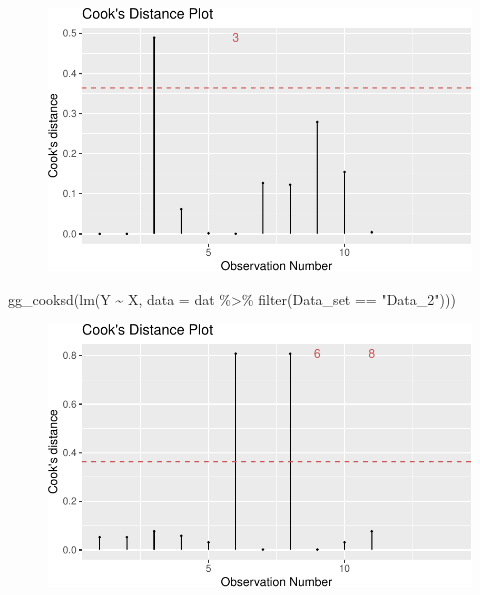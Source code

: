 \documentclass[
  letterpaper,
  DIV=11,
  numbers=noendperiod]{scrreprt}
\newenvironment{Shaded}{\begin{snugshade}}{\end{snugshade}}
\newcommand{\AttributeTok}[1]{\textcolor[rgb]{0.40,0.45,0.13}{#1}}
\newcommand{\FunctionTok}[1]{\textcolor[rgb]{0.28,0.35,0.67}{#1}}
\newcommand{\NormalTok}[1]{\textcolor[rgb]{0.00,0.23,0.31}{#1}}
\newcommand{\SpecialCharTok}[1]{\textcolor[rgb]{0.37,0.37,0.37}{#1}}
\newcommand{\StringTok}[1]{\textcolor[rgb]{0.13,0.47,0.30}{#1}}
\begin{document}
\begin{figure}[H]

{\centering \includegraphics{./08-linearreg_files/figure-pdf/unnamed-chunk-28-1.pdf}

}

\end{figure}

\begin{Shaded}
\begin{Highlighting}[]
\FunctionTok{gg\_cooksd}\NormalTok{(}\FunctionTok{lm}\NormalTok{(Y }\SpecialCharTok{\textasciitilde{}}\NormalTok{ X, }\AttributeTok{data =}\NormalTok{ dat }\SpecialCharTok{\%\textgreater{}\%} \FunctionTok{filter}\NormalTok{(Data\_set }\SpecialCharTok{==} \StringTok{"Data\_2"}\NormalTok{)))}
\end{Highlighting}
\end{Shaded}

\begin{figure}[H]

{\centering \includegraphics{./08-linearreg_files/figure-pdf/unnamed-chunk-28-2.pdf}

}

\end{figure}
\end{document}
